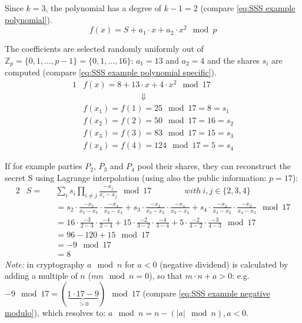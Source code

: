 Since $k=3$, the polynomial has a degree of $k-1=2$ (compare \ref{eq:SSS example polynomial}).
\begin{equation}
\label{eq:SSS example polynomial}
f(x) = S + a_1 \cdot x + a_2 \cdot x^2 \mod p
\end{equation}

The coefficients are selected randomly uniformly out of $\mathbb{Z}_p=\{0,1,...,p-1\}=\{0,1,...,16\}$: $a_1=13$ and $a_2=4$ and the shares $s_i$ are computed (compare \ref{eq:SSS example polynomial specific}).
\begin{alignat}{1}
& f(x) = 8 + 13 \cdot x + 4 \cdot x^2 \mod 17 \label{eq:SSS example polynomial specific} \\
&\qquad \qquad \qquad \quad \Downarrow \nonumber \\ 
& f(x_1)=f(1)=25\mod17=8=s_1 \nonumber \\
& f(x_2)=f(2)=50\mod17=16=s_2 \nonumber \\
& f(x_3)=f(3)=83\mod17=15=s_3 \nonumber \\
& f(x_4)=f(4)=124\mod17=5=s_4 \nonumber 
\end{alignat}

If for example parties $P_2$, $P_3$ and $P_4$ pool their shares, they can reconstruct the secret S using Lagrange interpolation (using also the public information: $p=17$):
\begin{alignat}{2}
& S = && \sum_i s_i \prod_{i \neq j} \frac{-x_j}{x_i - x_j } \mod 17 \qquad \qquad  with \ i,j \in \{2,3,4\} \\
& \quad && =s_2 \cdot \frac{-x_3}{x_2-x_3} \cdot \frac{-x_4}{x_2-x_4} + s_3 \cdot \frac{-x_2}{x_3-x_2} \cdot \frac{-x_4}{x_3-x_4} + s_4 \cdot \frac{-x_2}{x_4-x_2} \cdot \frac{-x_3}{x_4-x_3} \mod 17 \nonumber \\
& \quad && =16 \cdot \frac{-3}{2-3} \cdot \frac{-4}{2-4} + 15 \cdot \frac{-2}{3-2} \cdot \frac{-4}{3-4} + 5 \cdot \frac{-2}{4-2} \cdot \frac{-3}{4-3} \mod 17  \nonumber \\
& \quad && = 96-120+15 \mod 17 \nonumber \\
& \quad && = -9 \mod 17 \label{eq:SSS example negative modulo} \\
& \quad && = 8 \nonumber 
\end{alignat}
\textit{Note:} in cryptography $a \mod n$ for $a<0$ (negative dividend) is calculated by adding a multiple of  $n$ ($mn\mod n=0$), so that $m \cdot n+a>0$: e.g. $-9 \mod 17 = (\underbrace{1 \cdot 17-9}_{>0}) \mod 17$ (compare \ref{eq:SSS example negative modulo}), which resolves to: $a\mod n = n-(|a|\mod n), a<0$.

